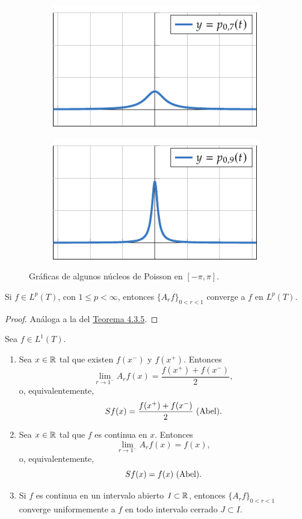 \documentclass[a4paper, 11pt, oneside]{report}
\begin{document}
\begin{figure}[H]
  \centering
  \begin{subfigure}[b]{0.49\textwidth}
    \centering
    \includegraphics{./plot25/main.pdf}
  \end{subfigure}
  \begin{subfigure}[b]{0.49\textwidth}
    \centering
    \includegraphics{./plot26/main.pdf}
  \end{subfigure}
  \caption{Gráficas de algunos núcleos de Poisson en $[-\pi,\pi]$.}
\end{figure}

\begin{theorem}
  Si $f \in L^p(T)$, con $1 \leq p < \infty$, entonces $\{A_rf\}_{0<r<1}$ converge a $f$ en $L^p(T)$.
\end{theorem}

\begin{proof}
  Análoga a la del \hyperref[teo:4.3.5]{\color{c1}Teorema 4.3.5}.
\end{proof}

\begin{theorem}
  Sea $f \in L^1(T)$.
  \begin{enumerate}
    \item Sea $x \in \mathbb R$ tal que existen $f(x^-)$ y $f(x^+)$. Entonces
    \[\lim_{r \to 1^-} A_rf(x) = \frac{f(x^+)+f(x^-)}{2},\]
    o, equivalentemente,
    \[Sf(x) = \frac{f(x^+)+f(x^-)}{2} \ (\textup{Abel}).\]
    \item Sea $x \in \mathbb R$ tal que $f$ es continua en $x$. Entonces
    \[\lim_{r \to 1^-} A_rf(x) = f(x),\]
    o, equivalentemente,
    \[Sf(x) = f(x) \ (\textup{Abel}).\]
    \item Si $f$ es continua en un intervalo abierto $I \subset \mathbb R$, entonces $\{A_rf\}_{0<r<1}$ converge uniformemente a $f$ en todo intervalo cerrado $J \subset I$.
  \end{enumerate}
\end{theorem}
\end{document}
